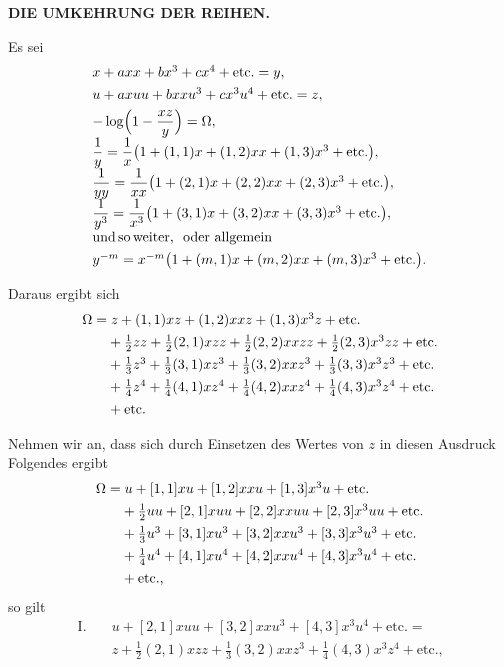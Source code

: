 \begin{center}
\textbf{DIE UMKEHRUNG DER REIHEN.}
\end{center}

\noindent\hspace*{\parindent}Es sei
\[
\begin{array}{l}
x+axx+bx^3+cx^4+\text{etc.}=y,\\[4pt]
u+axuu+bxxu^3+cx^3u^4+\text{etc.}=z,\\[4pt]
-\log\Bigl(1-\dfrac{xz}{y}\Bigr)=\Omega,\\[4pt]
\dfrac{1}{y}=\dfrac{1}{x}\bigl(1+(1,1)x+(1,2)xx+(1,3)x^3+\text{etc.}\bigr),\\[4pt]
\dfrac{1}{yy}=\dfrac{1}{xx}\bigl(1+(2,1)x+(2,2)xx+(2,3)x^3+\text{etc.}\bigr),\\[4pt]
\dfrac{1}{y^3}=\dfrac{1}{x^3}\bigl(1+(3,1)x+(3,2)xx+(3,3)x^3+\text{etc.}\bigr),\\[4pt]
\text{und\,so\,weiter,\ \ oder allgemein}\\[4pt]
y^{-m}=x^{-m}\bigl(1+(m,1)x+(m,2)xx+(m,3)x^3+\text{etc.}\bigr).
\end{array}
\]

\noindent Daraus ergibt sich
\[
\begin{array}{l}
\Omega=z+(1,1)xz+(1,2)xxz+(1,3)x^3z+\text{etc.}\\[4pt]
\hphantom{\Omega=}+\tfrac{1}{2}zz+\tfrac{1}{2}(2,1)xzz+\tfrac{1}{2}(2,2)xxzz+\tfrac{1}{2}(2,3)x^3zz+\text{etc.}\\[4pt]
\hphantom{\Omega=}+\tfrac{1}{3}z^3+\tfrac{1}{3}(3,1)xz^3+\tfrac{1}{3}(3,2)xxz^3+\tfrac{1}{3}(3,3)x^3z^3+\text{etc.}\\[4pt]
\hphantom{\Omega=}+\tfrac{1}{4}z^4+\tfrac{1}{4}(4,1)xz^4+\tfrac{1}{4}(4,2)xxz^4+\tfrac{1}{4}(4,3)x^3z^4+\text{etc.}\\[4pt]
\hphantom{\Omega=}+\text{etc.}
\end{array}
\]

Nehmen wir an, dass sich durch Einsetzen des Wertes von $z$ in diesen Ausdruck Folgendes ergibt
\[
\begin{array}{l}
\Omega=u+[1,1]xu+[1,2]xxu+[1,3]x^3u+\text{etc.}\\[4pt]
\hphantom{\Omega=}+\tfrac{1}{2}uu+[2,1]xuu+[2,2]xxuu+[2,3]x^3uu+\text{etc.}\\[4pt]
\hphantom{\Omega=}+\tfrac{1}{3}u^3+[3,1]xu^3+[3,2]xxu^3+[3,3]x^3u^3+\text{etc.}\\[4pt]
\hphantom{\Omega=}+\tfrac{1}{4}u^4+[4,1]xu^4+[4,2]xxu^4+[4,3]x^3u^4+\text{etc.}\\[4pt]
\hphantom{\Omega=}+\text{etc.,}
\end{array}
\]
\noindent so gilt
\[
\begin{aligned}\text{I.}\quad &u+[2,1]xuu+[3,2]xxu^3+[4,3]x^3u^4+\text{etc.}=\\ &z+\tfrac{1}{2}(2,1)xzz+\tfrac{1}{3}(3,2)xxz^3+\tfrac{1}{4}(4,3)x^3z^4+\text{etc.,}
\end{aligned}
\]


